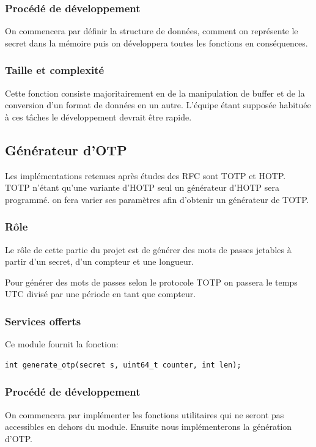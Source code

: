 \documentclass{"../../res/univ-projet"}
\begin{document}
\subsubsection{Procédé de développement}
On commencera par définir la structure de données, comment on représente le secret dans la mémoire
puis on développera toutes les fonctions en conséquences.

\subsubsection{Taille et complexité}
Cette fonction consiste majoritairement en de la manipulation de buffer et de la conversion d'un
format de données en un autre. L'équipe étant supposée habituée à ces tâches le développement devrait être 
rapide.

\subsection{Générateur d'OTP}
Les implémentations retenues après études des RFC sont TOTP et HOTP. TOTP
n'étant qu'une variante d'HOTP seul un générateur d'HOTP sera programmé.
on fera varier ses paramètres afin d'obtenir un générateur de TOTP.

\subsubsection{Rôle}
Le rôle de cette partie du projet est de générer des mots de passes jetables
à partir d'un secret, d'un compteur et une longueur. 

Pour générer des mots de passes selon le protocole TOTP on passera le temps UTC
divisé par une période en tant que compteur.

\subsubsection{Services offerts}
Ce module fournit la fonction:
\begin{lstlisting}
int generate_otp(secret s, uint64_t counter, int len);
\end{lstlisting}


\subsubsection{Procédé de développement}
On commencera par implémenter les fonctions utilitaires qui ne seront pas accessibles en
dehors du module. Ensuite nous implémenterons la génération d'OTP.
\end{document}
